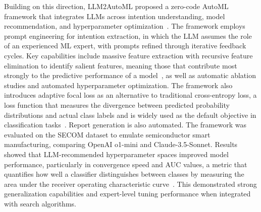 \documentclass[
english,                 %
bibtex,                  %
includeExtraAbstracts, %
]{kththesis}
\numberwithin{listing}{chapter}
\begin{document}
Building on this direction, \gls{LLM2AutoML} proposed a zero-code \gls{AutoML} framework that integrates \glspl{LLM} across intention understanding, model recommendation, and hyperparameter optimization~\cite{chen_llm2automl_2024}. The framework employs prompt engineering for intention extraction, in which the \gls{LLM} assumes the role of an experienced \gls{ML} expert, with prompts refined through iterative feedback cycles. Key capabilities include massive feature extraction with recursive feature elimination to identify salient features, meaning those that contribute most strongly to the predictive performance of a model~\cite{jim_dowling_building_2025}, as well as automatic ablation studies and automated hyperparameter optimization. The framework also introduces adaptive focal loss as an alternative to traditional cross-entropy loss, a loss function that measures the divergence between predicted probability distributions and actual class labels and is widely used as the default objective in classification tasks~\cite{rumelhart_learning_1986}. Report generation is also automated. The framework was evaluated on the \gls{SECOM} dataset to emulate semiconductor smart manufacturing, comparing Open\Gls{AI} o1-mini and Claude-3.5-Sonnet. Results showed that \gls{LLM}-recommended hyperparameter spaces improved model performance, particularly in convergence speed and \gls{AUC} values, a metric that quantifies how well a classifier distinguishes between classes by measuring the area under the receiver operating characteristic curve~\cite{alzubaidi_review_2021}. This demonstrated strong generalization capabilities and expert-level tuning performance when integrated with search algorithms.
\end{document}
